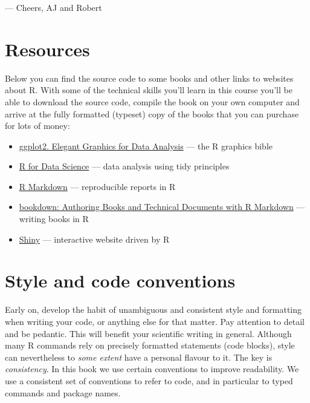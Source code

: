 \documentclass[]{book}
\providecommand{\tightlist}{%
  \setlength{\itemsep}{0pt}\setlength{\parskip}{0pt}}
\theoremstyle{definition}
\theoremstyle{definition}
\theoremstyle{definition}
\theoremstyle{remark}
\begin{document}
--- Cheers, AJ and Robert

\section{Resources}\label{resources}

Below you can find the source code to some books and other links to
websites about R. With some of the technical skills you'll learn in this
course you'll be able to download the source code, compile the book on
your own computer and arrive at the fully formatted (typeset) copy of
the books that you can purchase for lots of money:

\begin{itemize}
\tightlist
\item
  \href{https://github.com/hadley/ggplot2-book}{ggplot2. Elegant
  Graphics for Data Analysis} --- the R graphics bible
\item
  \href{http://r4ds.had.co.nz/workflow-basics.html}{R for Data Science}
  --- data analysis using tidy principles
\item
  \href{http://rmarkdown.rstudio.com}{R Markdown} --- reproducible
  reports in R
\item
  \href{https://bookdown.org/yihui/bookdown}{bookdown: Authoring Books
  and Technical Documents with R Markdown} --- writing books in R
\item
  \href{https://shiny.rstudio.com}{Shiny} --- interactive website driven
  by R
\end{itemize}

\section{Style and code conventions}\label{style-and-code-conventions}

Early on, develop the habit of unambiguous and consistent style and
formatting when writing your code, or anything else for that matter. Pay
attention to detail and be pedantic. This will benefit your scientific
writing in general. Although many R commands rely on precisely formatted
statements (code blocks), style can nevertheless to \emph{some extent}
have a personal flavour to it. The key is \emph{consistency}. In this
book we use certain conventions to improve readability. We use a
consistent set of conventions to refer to code, and in particular to
typed commands and package names.
\end{document}
